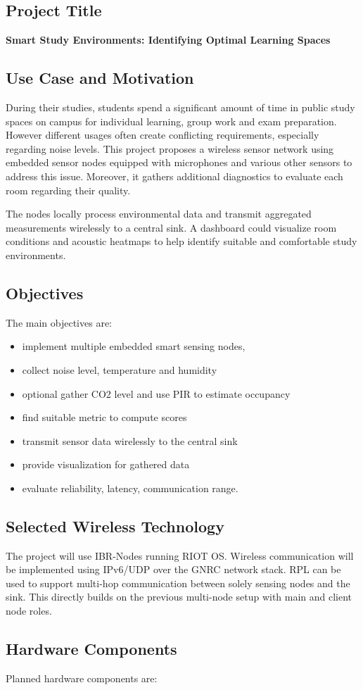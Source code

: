 \documentclass[11pt,a4paper]{article}
\newcommand{\projecttitle}[1]{\subsection*{#1}}
\begin{document}
\projecttitle{Project Title}

\textbf{Smart Study Environments: Identifying Optimal Learning Spaces}

\projecttitle{Use Case and Motivation}
During their studies, students spend a significant amount of time in public study spaces on campus for individual learning, group work and exam preparation. However different usages often create conflicting requirements, especially regarding noise levels. This project proposes a wireless sensor network using embedded sensor nodes equipped with microphones and various other sensors to address this issue.
Moreover, it gathers additional diagnostics to evaluate each room regarding their quality.

The nodes locally process environmental data and transmit aggregated measurements wirelessly to a central sink. A dashboard could visualize room conditions and acoustic heatmaps to help identify suitable and comfortable study environments.
\projecttitle{Objectives}

The main objectives are:

\begin{itemize}
    \item implement multiple embedded smart sensing nodes,
    \item collect noise level, temperature and humidity
    \item optional gather CO2 level and use PIR to estimate occupancy
    \item find suitable metric to compute scores
    \item transmit sensor data wirelessly to the central sink
    \item provide visualization for gathered data
    \item evaluate reliability, latency, communication range.
\end{itemize}

\projecttitle{Selected Wireless Technology}

The project will use IBR-Nodes running RIOT OS. Wireless communication will be implemented using IPv6/UDP over the GNRC network stack. RPL can be used to support multi-hop communication between solely sensing nodes and the sink. This directly builds on the previous multi-node setup with main and client node roles.

\projecttitle{Hardware Components}

Planned hardware components are:
\end{document}
